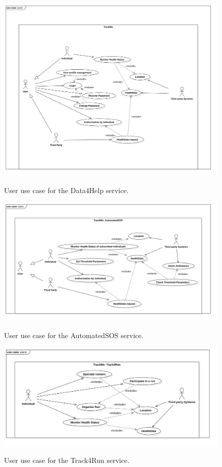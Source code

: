 \documentclass[12pt]{article}
\begin{document}
\begin{figure}[H]
\includegraphics[scale=0.2]{UseCase-Data4Help.png}
\centering
\label{fig:UseCase-Data4Help}
\caption{User use case for the Data4Help service.}
\end{figure}

\begin{figure}[H]
\includegraphics[scale=0.2]{UseCase-AutomatedSOS.png}
\centering
\label{fig:UseCase-AutomatedSOS}
\caption{User use case for the AutomatedSOS service.}
\end{figure}

\begin{figure}[H]
\includegraphics[scale=0.25]{UseCase-Track4Run.png}
\centering
\label{fig:UseCase-Track4Run}
\caption{User use case for the Track4Run service.}
\end{figure}
\end{document}
